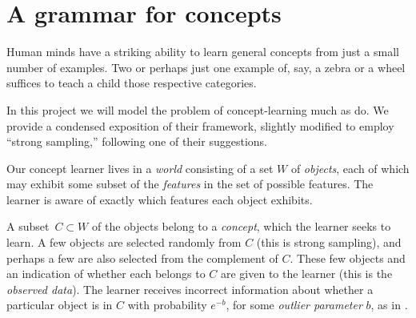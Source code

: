 \documentclass[jou,apacite]{apa6}
\author{Leon Lin}
\affiliation{\mbox{}}
\begin{document}
\maketitle    
                        
\section{A grammar for concepts}

Human minds have a striking ability to learn general concepts from
just a small number of examples. Two or perhaps just one example of,
say, a zebra or a wheel suffices to teach a child those respective
categories.

In this project we will
model the problem of concept-learning much as 
\citet*{rrdnf} do. We provide a 
condensed exposition of their framework, slightly modified to
employ ``strong sampling,'' following one of their suggestions.

Our concept learner lives in a \emph{world}
consisting of a set $W$ of \emph{objects}, each of which may exhibit
some subset of the \emph{features} in the set of possible features.
The learner is aware of exactly which features each object exhibits.

A subset~$C\subset W$ of the objects
 belong to a \emph{concept}, which the learner
seeks to learn. A few objects are selected randomly from $C$
(this is strong sampling), and
perhaps a few are also selected from the complement of $C$. These few
objects and an indication of whether each belongs to $C$ are given to
the learner (this is the \emph{observed data}). The learner receives
incorrect information about whether a particular object is in $C$ 
with probability $e^{-b}$, for some \emph{outlier parameter} $b$,
as in \citet{rrdnf}.
\end{document}
